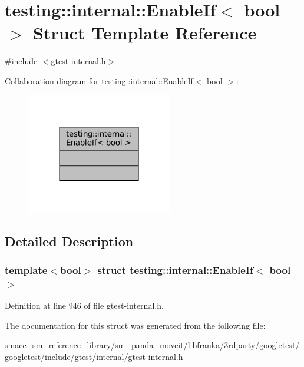 \hypertarget{structtesting_1_1internal_1_1EnableIf}{}\section{testing\+:\+:internal\+:\+:Enable\+If$<$ bool $>$ Struct Template Reference}
\label{structtesting_1_1internal_1_1EnableIf}


{\ttfamily \#include $<$gtest-\/internal.\+h$>$}



Collaboration diagram for testing\+:\+:internal\+:\+:Enable\+If$<$ bool $>$\+:
\nopagebreak
\begin{figure}[H]
\begin{center}
\leavevmode
\includegraphics[width=180pt]{structtesting_1_1internal_1_1EnableIf__coll__graph}
\end{center}
\end{figure}


\subsection{Detailed Description}
\subsubsection*{template$<$bool$>$\newline
struct testing\+::internal\+::\+Enable\+If$<$ bool $>$}



Definition at line 946 of file gtest-\/internal.\+h.



The documentation for this struct was generated from the following file\+:\begin{DoxyCompactItemize}
\item 
smacc\+\_\+sm\+\_\+reference\+\_\+library/sm\+\_\+panda\+\_\+moveit/libfranka/3rdparty/googletest/googletest/include/gtest/internal/\hyperlink{gtest-internal_8h}{gtest-\/internal.\+h}\end{DoxyCompactItemize}
